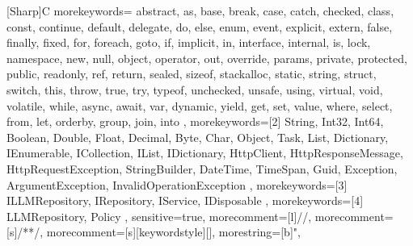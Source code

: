 [Sharp]{C}{
    morekeywords={
        abstract, as, base, break, case, catch, checked, class, const, continue,
        default, delegate, do, else, enum, event, explicit, extern, false, finally,
        fixed, for, foreach, goto, if, implicit, in, interface, internal, is, lock,
        namespace, new, null, object, operator, out, override, params, private,
        protected, public, readonly, ref, return, sealed, sizeof, stackalloc, static,
        string, struct, switch, this, throw, true, try, typeof, unchecked, unsafe,
        using, virtual, void, volatile, while, async, await, var, dynamic, yield,
        get, set, value, where, select, from, let, orderby, group, join, into
    },
    morekeywords=[2]{
        String, Int32, Int64, Boolean, Double, Float, Decimal, Byte, Char, Object,
        Task, List, Dictionary, IEnumerable, ICollection, IList, IDictionary,
        HttpClient, HttpResponseMessage, HttpRequestException, StringBuilder,
        DateTime, TimeSpan, Guid, Exception, ArgumentException, InvalidOperationException
    },
    morekeywords=[3]{
        ILLMRepository, IRepository, IService, IDisposable
    },
    morekeywords=[4]{
        LLMRepository, Policy
    },
    sensitive=true,
    morecomment=[l]{//},
    morecomment=[s]{/*}{*/},
    morecomment=[s][keywordstyle]{[}{]}, %
    morestring=[b]",
}


\hypersetup{
    colorlinks=true,
    linkcolor=black,
    filecolor=magenta,      
    urlcolor=cyan,
    citecolor=cyan,
}